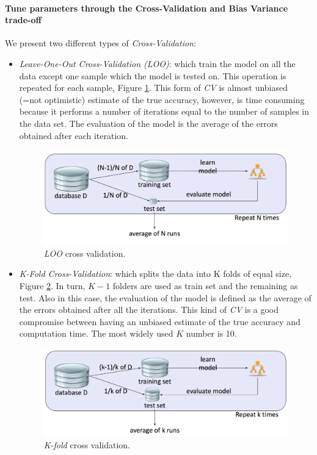 \paragraph{Tune parameters through the Cross-Validation and Bias Variance trade-off}

We present two different types of \emph{Cross-Validation}:
\begin{itemize}
\item \emph{Leave-One-Out Cross-Validation (LOO)}: which train the model on all the data except one sample which the model is tested on. This operation is repeated for each sample, Figure \ref{pic:loo}. This form of \emph{CV}  is almost unbiased (=not optimistic) estimate of the true accuracy, however, is time consuming because it performs a number of iterations equal to the number of samples in the data set. The evaluation of the model is the average of the errors obtained after each iteration.

\begin{figure}[H]%
 \centering
 \includegraphics[width=13cm]{./img/08/loo}
 \caption{\label{pic:loo} \emph{LOO} cross validation.}
\end{figure}

\item \emph{K-Fold Cross-Validation}: which splits the data into K folds of equal size, Figure \ref{pic:kfold}. In turn, $K-1$ folders are used as train set and the remaining as test. Also in this case, the evaluation of the model is defined as the average of the errors obtained after all the iterations. This kind of \emph{CV} is a good compromise between having an unbiased estimate of the true accuracy and computation time. The most widely used $K$ number is 10.

\begin{figure}[H]%
 \centering
 \includegraphics[width=13cm]{./img/08/kfold}
 \caption{\label{pic:kfold} \emph{K-fold} cross validation.}
\end{figure}

\end{itemize}

